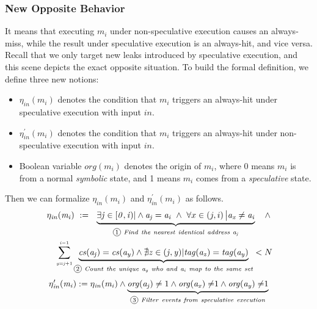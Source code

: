\documentclass[sigconf,screen]{acmart}
\newcommand*\circled[1]{\tikz[baseline=(char.base)]{
				\node[shape=circle,draw,inner sep=1pt] (char) {\scriptsize{#1}};}}
\begin{document}
\subsubsection{New Opposite Behavior}
\label{sec:new_opp}
It means that executing $\mathit{m_i}$ under non-speculative execution causes an 
always-miss, while the result under speculative execution is an always-hit, 
and vice versa. Recall that we only target new leaks introduced by speculative 
execution, and this scene depicts the exact opposite situation. To build the 
formal definition, we define three new notions: 
%
%
\begin{itemize}
  \item $\mathit{\eta_{in}(m_i)}$ denotes the condition that $\mathit{m_i}$ 
	triggers an always-hit under speculative execution with input $\mathit{in}$.
  \item $\mathit{\eta^\prime_{in}(m_i)}$ denotes the condition that $\mathit{m_i}$ 
	triggers an always-hit under non-speculative execution with input $\mathit{in}$.
  \item Boolean variable $\mathit{org(m_i)}$ denotes the origin of $\mathit{m_i}$, 
  where 0 means $\mathit{m_i}$ is from a normal \textit{symbolic} state, and 1 
	means $\mathit{m_i}$ comes from a \textit{speculative} state.
\end{itemize}
%
%
Then we can formalize $\mathit{\eta_{in}(m_i)}$ and $\mathit{\eta^\prime_{in}(m_i)}$ as follows. 
%
\begin{multline}
  \label{eqn:hc1}
    \mathit{\eta_{in}(m_i)}~:=~~ 
     \underbrace{ 
      \exists\mathit{j}\in[\mathit{0,i})|
      \wedge 
      \mathit{a_j}=\mathit{a_i} 
    ~\wedge~
      {\forall}x\in\left(j,i\right)\big|\mathit{a_x}\ne\mathit{a_i}
    }_{{\circled{1}}\mathit{~Find~the~nearest~identical~address~a_j}}
		~~~\wedge 
		\\
    ~~~~\sum_{{\scriptscriptstyle \mathit{y=j}+1}}^{{\scriptscriptstyle \mathit{i-}1}} 
    \underbrace{
      \mathit{cs(a_j)}=\mathit{cs(a_y)} 
      \wedge
      \nexists\mathit{z}\in(\mathit{j,y})|\mathit{tag(a_z)}=\mathit{tag(a_y)}
    }_{{\circled{2}}\mathit{~Count~the~unique~a_y~who~and~a_i~map~to~the~same~set}}
    <N
\end{multline}
\vspace{.2ex}
\begin{multline}
  \label{eqn:hc2}
    \mathit{\eta^\prime_{in}(m_i)}:=\mathit{\eta_{in}(m_i)}\wedge
    \underbrace{
      \mathit{org(a_j)}\ne1 
      \wedge
      \mathit{org(a_x)\ne}1 
      \wedge
      \mathit{org(a_y)\ne}1 
    }_{{\circled{3}}\mathit{~Filter~events~from~speculative~execution}}
\end{multline}
%
%
\end{document}

